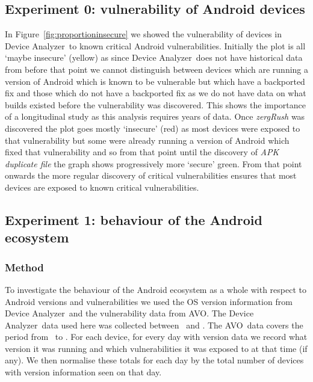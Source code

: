 \documentclass[conference,a4paper,twoside]{IEEEtran}
\newcommand{\da}{Device Analyzer}
\newcommand{\avo}{AVO}
\begin{document}

\subsection{Experiment 0: vulnerability of Android devices}\label{sec:exp:versionsecurity}
In Figure~\ref{fig:proportioninsecure} we showed the vulnerability of devices in \da\ to known critical Android vulnerabilities.
Initially the plot is all `maybe insecure' (yellow) as since \da\ does not have historical data from before that point we cannot distinguish between devices which are running a version of Android which is known to be vulnerable but which have a backported fix and those which do not have a backported fix as we do not have data on what builds existed before the vulnerability was discovered.
This shows the importance of a longitudinal study as this analysis requires years of data.
Once \emph{zergRush} was discovered the plot goes mostly `insecure' (red) as most devices were exposed to that vulnerability but some were already running a version of Android which fixed that vulnerability and so from that point until the discovery of \emph{APK duplicate file} the graph shows progressively more `secure' green.
From that point onwards the more regular discovery of critical vulnerabilities ensures that most devices are exposed to known critical vulnerabilities.


\subsection{Experiment 1: behaviour of the Android ecosystem}\label{sec:exp:android_ecosystem}

\subsubsection{Method}
To investigate the behaviour of the Android ecosystem as a whole with respect to Android versions and vulnerabilities we used the OS version information from \da\ and the vulnerability data from \avo.
The \da\ data used here was collected between \daStartDate\ and \daEndDate.
The \avo\ data covers the period from \avoFirstDataDate\ to \avoLastDataDate.
For each device, for every day with version data we record what version it was running and which vulnerabilities it was exposed to at that time (if any).
We then normalise these totals for each day by the total number of devices with version information seen on that day.
\end{document}
